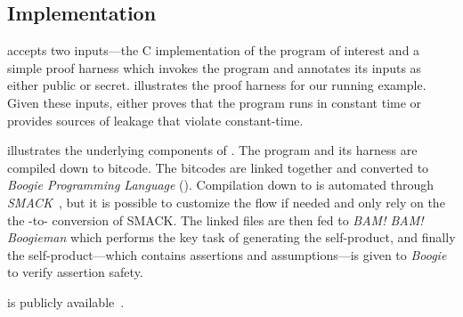 
\subsection{\ctVerif Implementation}
\label{sec:background-tool}

\ctVerif accepts two inputs---the C implementation of the program of interest and a simple proof harness which invokes the program and annotates its inputs as either public or secret.
 illustrates the proof harness for our running example.
Given these inputs, \ctVerif either proves that the program runs in constant time or provides sources of leakage that violate constant-time. 

 illustrates the underlying components of \ctVerif.
The program and its harness are compiled down to  bitcode. The
bitcodes are linked together and converted to \emph{Boogie Programming
Language} (). Compilation down to  is automated
through \emph{SMACK}~\cite{smack}, but it is possible to customize the flow if
needed and only rely on the the -to- conversion
of SMACK.
The linked  files are then fed to \emph{BAM! BAM! Boogieman} which
performs the key task of generating the self-product, and
finally the self-product---which contains assertions and assumptions---is
given to \emph{Boogie}~\cite{boogie} to verify assertion safety.

\ctVerif is publicly available~\cite{ct-verif-github}.

